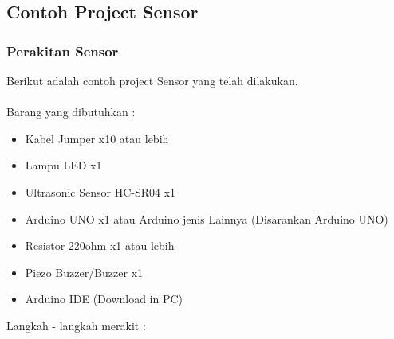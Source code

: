 \subsection{Contoh Project Sensor}
\subsubsection{Perakitan Sensor}
Berikut adalah contoh project Sensor yang telah dilakukan.\\\\ Barang yang dibutuhkan : 
\begin{itemize}
	\item Kabel Jumper x10 atau lebih
	\item Lampu LED x1
	\item Ultrasonic Sensor HC-SR04 x1
	\item Arduino UNO x1 atau Arduino jenis Lainnya (Disarankan Arduino UNO)
	\item Resistor 220ohm x1 atau lebih
	\item Piezo Buzzer/Buzzer x1
	\item Arduino IDE (Download in PC)
\end{itemize}
Langkah - langkah merakit : 
